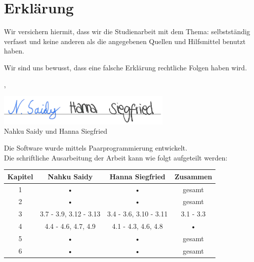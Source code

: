 
\thispagestyle{empty}

\section*{Erkl\"arung}
\vspace*{2em}

Wir versichern hiermit, dass wir die Studienarbeit mit dem Thema: {\itshape \titel} selbstst\"andig verfasst und keine anderen als die angegebenen Quellen und Hilfsmittel benutzt haben.

Wir sind uns bewusst, dass eine falsche Erklärung rechtliche Folgen haben wird.

\vspace{3em}

\abgabeort, \datumAbgabe
\vspace{4em}

{\includegraphics[height=1.5cm]{images/unterschrift_zusammen.png}}\\
Nahku Saidy und Hanna Siegfried

\vspace{4em}

Die Software wurde mittels Paarprogrammierung entwickelt.\\
Die schriftliche Ausarbeitung der Arbeit kann wie folgt aufgeteilt werden:

\begin{tabular}{c c c c}
\textbf{Kapitel} & \textbf{Nahku Saidy} & \textbf{Hanna Siegfried} & \textbf{Zusammen} \\ 
\hline 
1 & • & • & gesamt \\ 
2 & • & • & gesamt \\ 
3 & 3.7 - 3.9, 3.12 - 3.13 & 3.4 - 3.6, 3.10 - 3.11 & 3.1 - 3.3 \\ 
4 & 4.4 - 4.6, 4.7, 4.9 & 4.1 - 4.3, 4.6, 4.8 & • \\ 
5 & • & • & gesamt \\ 
6 & • & • & gesamt \\  
\end{tabular} 